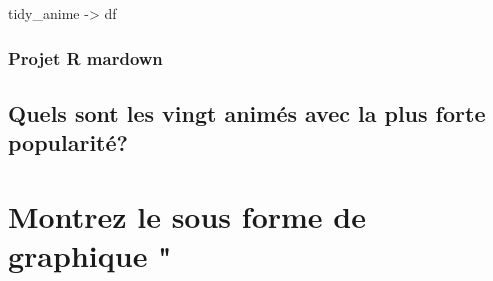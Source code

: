 \documentclass[]{article}
\newenvironment{Shaded}{\begin{snugshade}}{\end{snugshade}}
\newcommand{\DataTypeTok}[1]{\textcolor[rgb]{0.13,0.29,0.53}{#1}}
\newcommand{\DecValTok}[1]{\textcolor[rgb]{0.00,0.00,0.81}{#1}}
\newcommand{\KeywordTok}[1]{\textcolor[rgb]{0.13,0.29,0.53}{\textbf{#1}}}
\newcommand{\NormalTok}[1]{#1}
\newcommand{\OperatorTok}[1]{\textcolor[rgb]{0.81,0.36,0.00}{\textbf{#1}}}
\newcommand{\StringTok}[1]{\textcolor[rgb]{0.31,0.60,0.02}{#1}}
\begin{document}
\begin{Shaded}
\begin{Highlighting}[]
\NormalTok{tidy_anime ->}\StringTok{ }\NormalTok{df}
\end{Highlighting}
\end{Shaded}

\hypertarget{projet-r-mardown}{%
\subsubsection{Projet R mardown}\label{projet-r-mardown}}

\hypertarget{quels-sont-les-vingt-animes-avec-la-plus-forte-popularite}{%
\subsection{Quels sont les vingt animés avec la plus forte
popularité?}\label{quels-sont-les-vingt-animes-avec-la-plus-forte-popularite}}

\hypertarget{montrez-le-sous-forme-de-graphique}{%
\section{Montrez le sous forme de graphique
"}\label{montrez-le-sous-forme-de-graphique}}

\begin{Shaded}
\end{Shaded}
\end{document}
